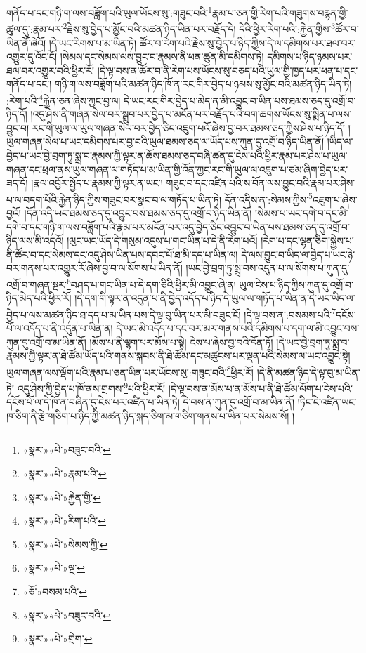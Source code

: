 གནོད་པ་དང་གཉི་ག་ལས་བཟློག་པའི་ཡུལ་ཡོངས་སུ་:གཟུང་བའི་\footnote{«སྣར་»«པེ་»བཟུང་བའི་}རྣམ་པ་ཅན་གྱི་རེག་པའི་གཟུགས་བརྙན་གྱི་ཚུལ་དུ་:རྣམ་པར་\footnote{«སྣར་»«པེ་»རྣམ་པའི་}རྗེས་སུ་བྱེད་པ་མྱོང་བའི་མཚན་ཉིད་ཡིན་པར་བརྗོད་དེ། དེའི་ཕྱིར་རེག་པའི་:རྐྱེན་གྱིས་\footnote{«སྣར་»«པེ་»རྐྱེན་གྱི་}ཚོར་བ་ཡིན་ནོ་ཞེའོ། །དེ་ཡང་རིགས་པ་མ་ཡིན་ཏེ། ཚོར་བ་རེག་པའི་རྗེས་སུ་བྱེད་པ་ཉིད་ཀྱིས་དེ་ལ་དམིགས་པར་ཐལ་བར་འགྱུར་དུ་འོང་ངོ། །སེམས་དང་སེམས་ལས་བྱུང་བ་རྣམས་ནི་ཕན་ཚུན་མི་དམིགས་ཏེ། དམིགས་པ་ཉིད་ཉམས་པར་ཐལ་བར་འགྱུར་བའི་ཕྱིར་རོ། །དེ་ལྟ་བས་ན་ཚོར་བ་ནི་རེག་པས་ཡོངས་སུ་བཅད་པའི་ཡུལ་གྱི་ཁྱད་པར་ཕན་པ་དང་གནོད་པ་དང་། གཉི་ག་ལས་བཟློག་པའི་མཚན་ཉིད་ཁོ་ན་རང་གིར་བྱེད་པ་ཉམས་སུ་མྱོང་བའི་མཚན་ཉིད་ཡིན་ཏེ། :རེག་པའི་\footnote{«སྣར་»«པེ་»རིག་པའི་}རྐྱེན་ཅན་ཞེས་ཀྱང་བྱ་ལ། དེ་ཡང་རང་གིར་བྱེད་པ་མེད་ན་མི་འབྱུང་བ་ཡིན་པས་ཐམས་ཅད་དུ་འགྲོ་བ་ཉིད་དོ། །འདུ་ཤེས་ནི་གཞན་སེལ་བར་སྒྲུབ་པར་བྱེད་པ་མངོན་པར་བརྗོད་པའི་བག་ཆགས་ཡོངས་སུ་སྨིན་པ་ལས་བྱུང་བ། རང་གི་ཡུལ་ལ་ཡུལ་གཞན་སེལ་བར་བྱེད་ཅིང་འཇུག་པའོ་ཞེས་བྱ་བར་ཐམས་ཅད་ཀྱིས་ཤེས་པ་ཉིད་དོ། །ཡུལ་གཞན་སེལ་པ་ཡང་དམིགས་པར་བྱ་བའི་ཡུལ་ཐམས་ཅད་ལ་ཡོད་པས་ཀུན་དུ་འགྲོ་བ་ཉིད་ཡིན་ནོ། །ཡིད་ལ་བྱེད་པ་ཡང་བྱེ་བྲག་ཏུ་སྨྲ་བ་རྣམས་ཀྱི་ལྟར་ན་ཆོས་ཐམས་ཅད་བཞི་ཚན་དུ་ངེས་པའི་ཕྱིར་རྣམ་པར་ཤེས་པ་ཡུལ་གཞན་དང་ཕྲལ་ནས་ཡུལ་གཞན་ལ་གཏོད་པ་མ་ཡིན་གྱི་འོན་ཀྱང་རང་གི་ཡུལ་ལ་འཇུག་པ་ཙམ་ཞིག་བྱེད་པར་ཟད་དོ། །རྣལ་འབྱོར་སྤྱོད་པ་རྣམས་ཀྱི་ལྟར་ན་ཡང་། གཟུང་བ་དང་འཛིན་པའི་ས་བོན་ལས་བྱུང་བའི་རྣམ་པར་ཤེས་པ་ལ་བདག་པོའི་རྐྱེན་ཉིད་ཀྱིས་གཟུང་བར་སྣང་བ་ལ་གཏོད་པ་ཡིན་ཏེ། དོན་འདིས་ན་:སེམས་ཀྱིས་\footnote{«སྣར་»«པེ་»སེམས་ཀྱི་}འཇུག་པ་ཞེས་བྱའོ། །དོན་འདི་ཡང་ཐམས་ཅད་དུ་འབྱུང་བས་ཐམས་ཅད་དུ་འགྲོ་བ་ཉིད་ཡིན་ནོ། །སེམས་པ་ཡང་དགེ་བ་དང་མི་དགེ་བ་དང་གཉི་ག་ལས་བཟློག་པའི་རྣམ་པར་མངོན་པར་འདུ་བྱེད་ཅིང་འབྱུང་བ་ཡིན་པས་ཐམས་ཅད་དུ་འགྲོ་བ་ཉིད་ལས་མི་འདའོ། །ལུང་ཡང་ཡོད་དེ་གསུམ་འདུས་པ་གང་ཡིན་པ་དེ་ནི་རེག་པའོ། །རེག་པ་དང་ལྷན་ཅིག་སྐྱེས་པ་ནི་ཚོར་བ་དང་སེམས་དང་འདུ་ཤེས་ཡིན་པས་དབང་པོ་ཐ་མི་དད་པ་ཡིན་ལ། དེ་ལས་བྱུང་བ་ཡིད་ལ་བྱེད་པ་ཡང་ཉེ་བར་གནས་པར་འགྱུར་རོ་ཞེས་བྱ་བ་ལ་སོགས་པ་ཡིན་ནོ། །ཡང་བྱེ་བྲག་ཏུ་སྨྲ་བས་འདུན་པ་ལ་སོགས་པ་ཀུན་དུ་འགྲོ་བ་གཞན་སྔར་\footnote{«སྣར་»«པེ་»ལྔ་}བཤད་པ་གང་ཡིན་པ་དེ་དག་ཅིའི་ཕྱིར་མི་འབྱུང་ཞེ་ན། ཡུལ་ངེས་པ་ཉིད་ཀྱིས་ཀུན་དུ་འགྲོ་བ་ཉིད་མེད་པའི་ཕྱིར་རོ། །དེ་དག་གི་ལྟར་ན་འདུན་པ་ནི་བྱེད་འདོད་པ་ཉིད་དེ་ཡུལ་ལ་གཏོད་པ་ཡིན་ན་དེ་ཡང་ཡིད་ལ་བྱེད་པ་ལས་མཚན་ཉིད་ཐ་དད་པ་མ་ཡིན་པས་དེ་ལྟ་བུ་ཡིན་པར་མི་བཟུང་ངོ། །དེ་ལྟ་བས་ན་:བསམས་པའི་\footnote{«ཅོ་»བསམ་པའི་}དངོས་པོ་ལ་འདོད་པ་ནི་འདུན་པ་ཡིན་ན། དེ་ཡང་མི་འདོད་པ་དང་བར་མར་གནས་པའི་དམིགས་པ་དག་ལ་མི་འབྱུང་བས་ཀུན་དུ་འགྲོ་བ་མ་ཡིན་ནོ། །མོས་པ་ནི་ལྷག་པར་མོས་པ་སྟེ། ངེས་པ་ཞེས་བྱ་བའི་དོན་ཏོ། །དེ་ཡང་བྱེ་བྲག་ཏུ་སྨྲ་བ་རྣམས་ཀྱི་ལྟར་ན་ཐེ་ཚོམ་ཡོད་པའི་གནས་སྐབས་ནི་ཐེ་ཚོམ་དང་མཚུངས་པར་ལྡན་པའི་སེམས་ལ་ཡང་འབྱུང་སྟེ། ཡུལ་གཞན་ལས་ལྡོག་པའི་རྣམ་པ་ཅན་ཡིན་པར་ཡོངས་སུ་:གཟུང་བའི་\footnote{«སྣར་»«པེ་»བཟུང་བའི་}ཕྱིར་རོ། །དེ་ནི་མཚན་ཉིད་དེ་ལྟ་བུ་མ་ཡིན་ཏེ། འདུ་ཤེས་ཀྱི་བྱེད་པ་ཁོ་ནས་གྲགས་\footnote{«སྣར་»«པེ་»གྲེག་}པའི་ཕྱིར་རོ། །དེ་ལྟ་བས་ན་མོས་པ་ན་མོས་པ་ནི་ཐེ་ཚོམ་ལོག་པ་ངེས་པའི་དངོས་པོ་ལ་དེ་ཁོ་ན་བཞིན་དུ་ངེས་པར་འཛིན་པ་ཡིན་ཏེ། དེ་བས་ན་ཀུན་དུ་འགྲོ་བ་མ་ཡིན་ནོ། །ཏིང་ངེ་འཛིན་ཡང་ཁ་ཅིག་ནི་རྩེ་གཅིག་པ་ཉིད་ཀྱི་མཚན་ཉིད་སྐད་ཅིག་མ་གཅིག་གནས་པ་ཡིན་པར་སེམས་སོ། །
